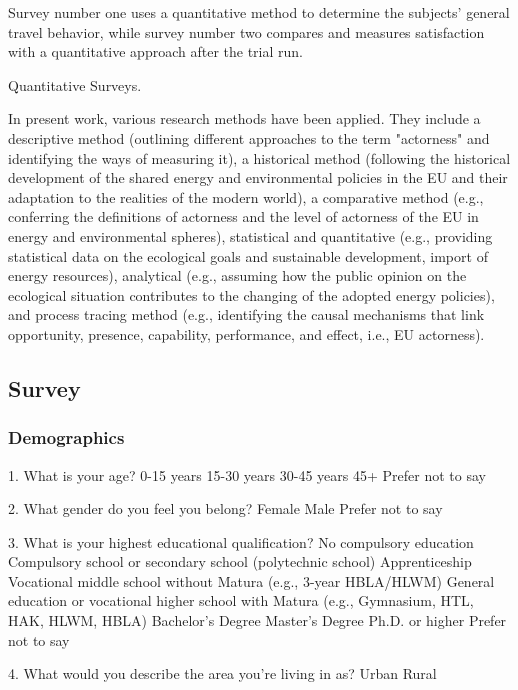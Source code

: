 Survey number one uses a quantitative method to determine the subjects' general travel behavior, while survey number two compares and measures satisfaction with a quantitative approach after the trial run.



Quantitative Surveys.




In present work, various research methods have been applied. They include a descriptive method (outlining different approaches to the term "actorness" and identifying the ways of measuring it), a historical method (following the historical development of the shared energy and environmental policies in the EU and their adaptation to the realities of the modern world), a comparative method (e.g., conferring the definitions of actorness and the level of actorness of the EU in energy and environmental spheres), statistical and quantitative (e.g., providing statistical data on the ecological goals and sustainable development, import of energy resources), analytical (e.g., assuming how the public opinion on the ecological situation contributes to the changing of the adopted energy policies), and process tracing method (e.g., identifying the causal mechanisms that link opportunity, presence, capability, performance, and effect, i.e., EU actorness).




\subsection{Survey}



\subsubsection{Demographics}

1. What is your age?
0-15 years
15-30 years
30-45 years
45+
 Prefer not to say

2. What gender do you feel you belong?
Female
Male
Prefer not to say

3. What is your highest educational qualification?
No compulsory education 
Compulsory school or secondary school (polytechnic school)
Apprenticeship 
Vocational middle school without Matura (e.g., 3-year HBLA/HLWM) 
General education or vocational higher school with Matura (e.g., Gymnasium, HTL, HAK, HLWM, HBLA) 
Bachelor's Degree
Master's Degree
Ph.D. or higher
Prefer not to say

4. What would you describe the area you’re living in as?
Urban
Rural

